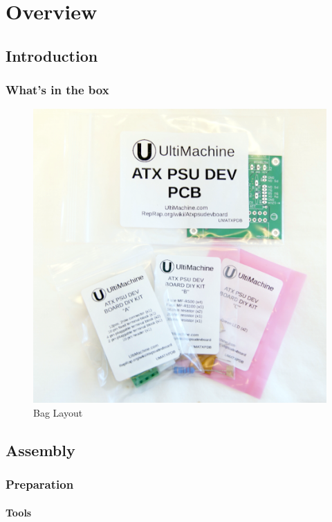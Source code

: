\section{Overview}

\subsection{Introduction}

\subsubsection{What's in the box}

\begin{figure}[htbp]
\centering
\includegraphics{./png/kit.png}
\caption{Bag Layout}
\end{figure}

\subsection{Assembly}

\subsubsection{Preparation}

\paragraph{Tools}

